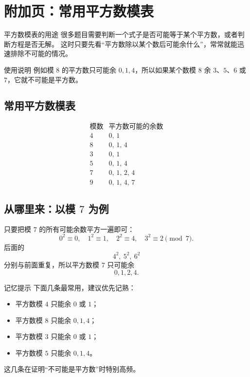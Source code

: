 \documentclass[11pt,a4paper,fontset=fandol]{ctexart}
\theoremstyle{formaltheorem}
\theoremstyle{formalexample}
\begin{document}
\newpage
\section{附加页：常用平方数模表}

\begin{goalbox}{平方数模表的用途}
很多题目需要判断一个式子是否可能等于某个平方数，或者判断方程是否无解。
这时只要先看“平方数除以某个数后可能余什么”，常常就能迅速排除不可能的情况。
\end{goalbox}

\begin{notebox}{使用说明}
例如模 $8$ 的平方数只可能余 $0,1,4$，所以如果某个数模 $8$ 余 $3$、$5$、$6$ 或 $7$，它就不可能是平方数。
\end{notebox}

\subsection*{常用平方数模表}

\[
\renewcommand{\arraystretch}{1.4}
\begin{array}{c|c}
\text{模数} & \text{平方数可能的余数} \\
\hline
4 & 0,\,1 \\
8 & 0,\,1,\,4 \\
3 & 0,\,1 \\
5 & 0,\,1,\,4 \\
7 & 0,\,1,\,2,\,4 \\
9 & 0,\,1,\,4,\,7
\end{array}
\]

\subsection*{从哪里来：以模 $7$ 为例}

只要把模 $7$ 的所有可能余数平方一遍即可：
\[
0^2\equiv 0,\quad 1^2\equiv 1,\quad 2^2\equiv 4,\quad 3^2\equiv 2\pmod 7.
\]
后面的
\[
4^2,\ 5^2,\ 6^2
\]
分别与前面重复，所以平方数模 $7$ 只可能余
\[
0,1,2,4.
\]

\begin{notebox}{记忆提示}
下面几条最常用，建议优先记熟：
\begin{itemize}
  \item 平方数模 $4$ 只能余 $0$ 或 $1$；
  \item 平方数模 $8$ 只能余 $0,1,4$；
  \item 平方数模 $3$ 只能余 $0$ 或 $1$；
  \item 平方数模 $5$ 只能余 $0,1,4$。
\end{itemize}
这几条在证明“不可能是平方数”时特别高频。
\end{notebox}
\end{document}
